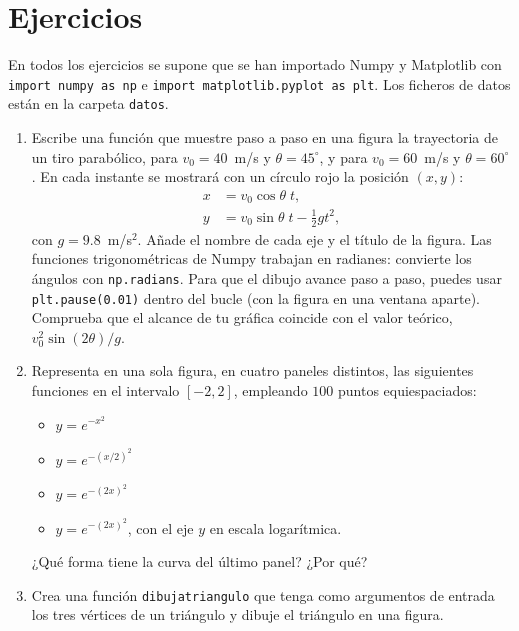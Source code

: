\newpage
\section{Ejercicios}

En todos los ejercicios se supone que se han importado Numpy y Matplotlib con \texttt{import numpy as np} e \texttt{import matplotlib.pyplot as plt}. Los ficheros de datos están en la carpeta \texttt{datos}.
\begin{enumerate}
\item Escribe una función que muestre paso a paso en una figura la trayectoria de un tiro parabólico, para $v_0=40$~m/s y $\theta=45^\circ$, y para $v_0=60$~m/s y $\theta=60^\circ$. En cada instante se mostrará con un círculo rojo la posición $(x, y)$:
\begin{align*}
    x&=v_0 \cos\theta \; t, \\
    y&=v_0 \sin\theta \; t -\frac{1}{2} g t^2,
\end{align*}
con $g=9.8$~m/s$^2$. Añade el nombre de cada eje y el título de la figura. Las funciones trigonométricas de Numpy trabajan en radianes: convierte los ángulos con \texttt{np.radians}. Para que el dibujo avance paso a paso, puedes usar \texttt{plt.pause(0.01)} dentro del bucle (con la figura en una ventana aparte). Comprueba que el alcance de tu gráfica coincide con el valor teórico, $v_0^2\sin(2\theta)/g$.

\item Representa en una sola figura, en cuatro paneles distintos, las siguientes funciones en el intervalo $[-2,2]$, empleando $100$ puntos equiespaciados:
\begin{itemize}
    \item $y=e^{-x^2}$
    \item $y=e^{-(x/2)^2}$
    \item $y=e^{-(2x)^2}$
    \item $y=e^{-(2x)^2}$, con el eje $y$ en escala logarítmica.
\end{itemize}
¿Qué forma tiene la curva del último panel? ¿Por qué?

\item Crea una función \texttt{dibujatriangulo} que tenga como argumentos de entrada los tres vértices de un triángulo y dibuje el triángulo en una figura.


\end{enumerate}
